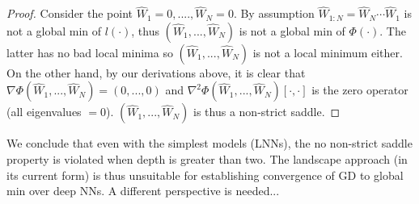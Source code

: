 \documentclass[12pt]{article}
\begin{document}
	\begin{proof}
	    Consider the point
	    ${\widehat{W}_1} = 0, ...., {\widehat{W}_N} = 0$. By assumption ${\widehat{W}_{1:N}}={\widehat{W}_N}\cdots{\widehat{W}_1}$ is not a global min of $l(\cdot)$, thus $({\widehat{W}_1},...,{\widehat{W}_N})$ is not a global min of $\Phi(\cdot)$.
	    The latter has no bad local minima so $({\widehat{W}_1},...,{\widehat{W}_N})$ is not a local minimum either.
	    On the other hand, by our derivations above, it is clear that
	    $\nabla{\Phi}{({\widehat{W}_1},...,{\widehat{W}_N})} = (0,...,0)$ and 
	    ${\nabla^2}{\Phi}{({\widehat{W}_1},...,{\widehat{W}_N})}[\cdot,\cdot]$ is the zero operator (all eigenvalues $= 0$). $({\widehat{W}_1},...,{\widehat{W}_N})$ is thus a non-strict saddle.
	\end{proof}
	We conclude that even with the simplest models (LNNs), the no non-strict saddle property is violated when depth is greater than two.
	The landscape approach (in its current form) is thus unsuitable for establishing convergence of GD to global min over deep NNs. A different perspective is needed...
	
{\small
		
	
}
	
\end{document}
